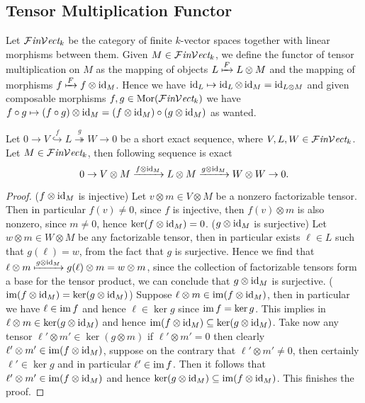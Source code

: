 \subsection{Tensor Multiplication Functor}

\begin{definition}
  Let \({\mathcal{F}\textit{in}\mathcal{V}\textit{ect}}_k\) be the category of finite \(k\)-vector spaces together
  with linear morphisms between them. Given \(M \in {\mathcal{F}\textit{in}\mathcal{V}\textit{ect}}_k\), we define
  the functor of tensor multiplication on \(M\) as the mapping of objects \(L
  \xmapsto F L \otimes M\) and the mapping of morphisms \(f \xmapsto F f \otimes
  \operatorname{id}_M\). Hence we have \(\operatorname{id}_L \mapsto \operatorname{id}_L \otimes \operatorname{id}_M = \operatorname{id}_{L \otimes
  M}\) and given composable morphisms \(f, g \in \operatorname{Mor}({\mathcal{F}\textit{in}\mathcal{V}\textit{ect}}_k)\) we have
  \(f \circ g \mapsto (f \circ g) \otimes \operatorname{id}_M = (f \otimes \operatorname{id}_M) \circ (g
  \otimes \operatorname{id}_M)\) as wanted.
\end{definition}

\begin{proposition}[Exactness]
  Let \(0 \to V \overset{f}\hookrightarrow L \overset{g}\twoheadrightarrow W \to
  0\) be a short exact sequence, where \(V, L, W \in {\mathcal{F}\textit{in}\mathcal{V}\textit{ect}}_k\). Let \(M
  \in {\mathcal{F}\textit{in}\mathcal{V}\textit{ect}}_k\), then following sequence is exact
  \[
    0 \to V \otimes M \xrightarrow{f \otimes \operatorname{id}_M}
    L \otimes M \xrightarrow{g \otimes \operatorname{id}_M} W \otimes W \to 0.
  \]
\end{proposition}

\begin{proof}
  (\(f \otimes \operatorname{id}_M\) is injective) Let \(v \otimes m \in V \otimes M\) be a
  nonzero factorizable tensor. Then in particular \(f(v) \neq 0\), since \(f\)
  is injective, then \(f(v) \otimes m\) is also nonzero, since \(m \neq 0\),
  hence \(\ker(f \otimes \operatorname{id}_M) = 0\). (\(g \otimes \operatorname{id}_M\) is surjective) Let
  \(w \otimes m \in W \otimes M\) be any factorizable tensor, then in particular
  exists \(\ell \in L\) such that \(g(\ell) = w\), from the fact that \(g\) is
  surjective. Hence we find that \(\ell \otimes m \xmapsto{g \otimes \operatorname{id}_M}
  g(\ell) \otimes m = w \otimes m\), since the collection of factorizable
  tensors form a base for the tensor product, we can conclude that \(g \otimes
  \operatorname{id}_M\) is surjective. (\(\operatorname{im}(f \otimes \operatorname{id}_M) = \ker(g \otimes \operatorname{id}_M)\))
  Suppose \(\ell \otimes m \in \operatorname{im}(f \otimes \operatorname{id}_M)\), then in particular we
  have \(\ell \in \operatorname{im} f\) and hence \(\ell \in \ker g\) since \(\operatorname{im} f = \ker
  g\). This implies in \(\ell \otimes m \in \ker(g \otimes \operatorname{id}_M)\) and hence
  \(\operatorname{im}(f \otimes \operatorname{id}_M) \subseteq \ker(g \otimes \operatorname{id}_M)\). Take now any tensor
  \(\ell' \otimes m' \in \ker(g \otimes m)\) if \(\ell' \otimes m' = 0\) then
  clearly  \(\ell' \otimes m' \in \operatorname{im}(f \otimes \operatorname{id}_M)\), suppose on the
  contrary that \(\ell' \otimes m' \neq 0\), then certainly \(\ell' \in \ker g\)
  and in particular \(\ell' \in \operatorname{im} f\). Then it follows that \(\ell' \otimes m'
  \in \operatorname{im}(f \otimes \operatorname{id}_M)\) and hence \(\ker(g \otimes \operatorname{id}_M) \subseteq \operatorname{im}(f
  \otimes \operatorname{id}_M)\). This finishes the proof.
\end{proof}

